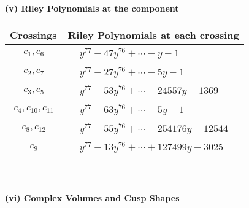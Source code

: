 \documentclass[1p]{elsarticle_modified}
\theoremstyle{definition}
\begin{document}
\newpage\renewcommand{\arraystretch}{1}
\flushleft \textbf{(v) Riley Polynomials at the component}\newline \\
\begin{tabular}{m{50pt}|m{274pt}}
Crossings & \hspace{64pt}Riley Polynomials at each crossing \\
\hline $$\begin{aligned}c_{1},c_{6}\end{aligned}$$&$\begin{aligned}
&y^{77}+47 y^{76}+\cdots- y-1
\end{aligned}$\\
\hline $$\begin{aligned}c_{2},c_{7}\end{aligned}$$&$\begin{aligned}
&y^{77}+27 y^{76}+\cdots-5 y-1
\end{aligned}$\\
\hline $$\begin{aligned}c_{3},c_{5}\end{aligned}$$&$\begin{aligned}
&y^{77}-53 y^{76}+\cdots-24557 y-1369
\end{aligned}$\\
\hline $$\begin{aligned}c_{4},c_{10},c_{11}\end{aligned}$$&$\begin{aligned}
&y^{77}+63 y^{76}+\cdots-5 y-1
\end{aligned}$\\
\hline $$\begin{aligned}c_{8},c_{12}\end{aligned}$$&$\begin{aligned}
&y^{77}+55 y^{76}+\cdots-254176 y-12544
\end{aligned}$\\
\hline $$\begin{aligned}c_{9}\end{aligned}$$&$\begin{aligned}
&y^{77}-13 y^{76}+\cdots+127499 y-3025
\end{aligned}$\\
\hline
\end{tabular}\\~\\
\newpage\flushleft \textbf{(vi) Complex Volumes and Cusp Shapes}
\end{document}
